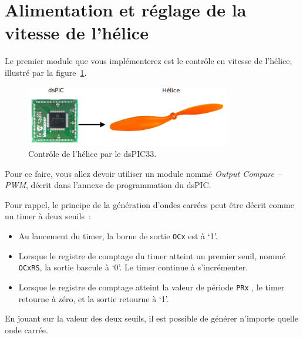 \documentclass[11pt,a4paper]{article}
\theoremstyle{definition}%
\begin{document}


\section{Alimentation et réglage de la vitesse de l'hélice}
Le premier module que vous implémenterez est le contrôle en vitesse de l'hélice, illustré par la figure~\ref{fig:helice}.

\begin{figure}[H]
\center
\includegraphics[width=0.8\textwidth]{alim-helice}
\caption{Contrôle de l'hélice par le dsPIC33.}
\label{fig:helice}
\end{figure}

Pour ce faire, vous allez devoir utiliser un module nommé \textit{Output Compare -- PWM}, décrit dans l’annexe de programmation du dsPIC.

Pour rappel, le principe de la génération d’ondes carrées peut être décrit comme un timer à deux seuils~:
\begin{itemize}
	\item Au lancement du timer, la borne de sortie \texttt{OCx} est à ‘1’.
	\item Lorsque le registre de comptage du timer atteint un premier seuil, nommé \texttt{OCxRS}, la sortie bascule à ‘0’.
	Le timer continue à s’incrémenter.
	\item Lorsque le registre de comptage atteint la valeur de période \texttt{PRx} , le timer retourne à zéro, et la sortie retourne à ‘1’.
\end{itemize}

En jouant sur la valeur des deux seuils, il est possible de générer n’importe quelle onde carrée.
\end{document}
